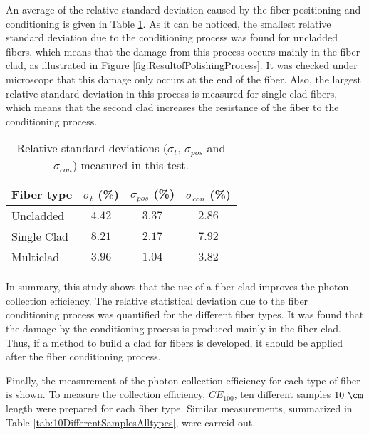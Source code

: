 An average of the relative standard deviation caused by the fiber positioning and conditioning is given in Table \ref{tab:RelativeStandardDeviations}. As it can be noticed, the smallest relative standard deviation due to the conditioning process was found for uncladded fibers, which means that the damage from this process occurs mainly in the fiber clad, as illustrated in Figure \ref{fig:ResultofPolishingProcess}. It was checked under microscope that this damage only occurs at the end of the fiber. Also, the largest relative standard deviation in this process is measured for single clad fibers, which means that the second clad increases the resistance of the fiber to the conditioning process.

\begin{table}[htbp]
\centering{}%
\begin{tabular}{lccc}
\toprule 
Fiber type & $\sigma_t$ (\%) & $\sigma_{pos}$ (\%) & $\sigma_{con}$ (\%) \tabularnewline
\midrule
\midrule 
Uncladded & $4.42$ & $3.37$ & $2.86$ \tabularnewline
Single Clad & $8.21$ & $2.17$ & $7.92$ \tabularnewline
Multiclad & $3.96$ & $1.04$ & $3.82$ \tabularnewline
\bottomrule
\end{tabular}
\caption{Relative standard deviations ($\sigma_t$, $\sigma_{pos}$ and $\sigma_{con}$) measured in this test.}
\label{tab:RelativeStandardDeviations}
\end{table}

In summary, this study shows that the use of a fiber clad improves the photon collection efficiency. The relative statistical deviation due to the fiber conditioning process was quantified for the different fiber types. It was found that the damage by the conditioning process is produced mainly in the fiber clad. Thus, if a method to build a clad for fibers is developed, it should be applied after the fiber conditioning process.

Finally, the measurement of the photon collection efficiency for each type of fiber is shown. To measure the collection efficiency, $CE_{100}$, ten different samples $10~\cm$ length were prepared for each fiber type. Similar measurements, summarized in Table \ref{tab:10DifferentSamplesAlltypes}, were carreid out.

